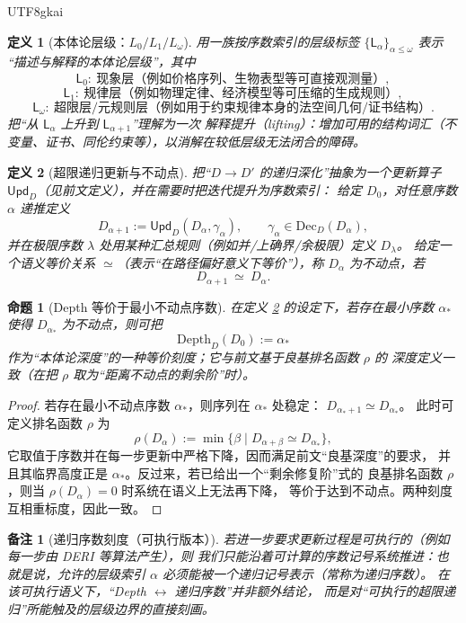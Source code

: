 \documentclass[12pt]{article}
\newtheorem{definition}{定义}[section]
\newtheorem{proposition}{命题}[section]
\newtheorem{remark}{备注}[section]
\begin{document}
\begin{CJK*}{UTF8}{gkai}
\begin{definition}[本体论层级：$L_0/L_1/L_\omega$]\label{def:onto-level}
用一族按序数索引的层级标签 $\{\mathsf{L}_\alpha\}_{\alpha\le\omega}$ 表示
“描述与解释的本体论层级”，其中
\[
  \mathsf{L}_0:\ \text{现象层（例如价格序列、生物表型等可直接观测量）},
\]
\[
  \mathsf{L}_1:\ \text{规律层（例如物理定律、经济模型等可压缩的生成规则）},
\]
\[
  \mathsf{L}_\omega:\ \text{超限层/元规则层（例如用于约束规律本身的法空间几何/证书结构）}.
\]
把“从 $\mathsf{L}_\alpha$ 上升到 $\mathsf{L}_{\alpha+1}$”理解为一次
\emph{解释提升（lifting）}：增加可用的结构词汇（不变量、证书、同伦约束等），以消解在较低层级无法闭合的障碍。
\end{definition}

\begin{definition}[超限递归更新与不动点]\label{def:transfinite-fixed-point}
把“$D\to D'$ 的递归深化”抽象为一个更新算子
$\mathsf{Upd}_D$（见前文定义），并在需要时把迭代提升为序数索引：
给定 $D_0$，对任意序数 $\alpha$ 递推定义
\[
  D_{\alpha+1}:=\mathsf{Upd}_D(D_\alpha,\gamma_\alpha),
\qquad
  \gamma_\alpha\in \mathrm{Dec}_D(D_\alpha),
\]
并在极限序数 $\lambda$ 处用某种汇总规则（例如并/上确界/余极限）定义 $D_\lambda$。
给定一个语义等价关系 $\simeq$（表示“在路径偏好意义下等价”），称 $D_\alpha$ 为\emph{不动点}，若
\[
  D_{\alpha+1}\ \simeq\ D_\alpha.
\]
\end{definition}

\begin{proposition}[Depth 等价于最小不动点序数]\label{prop:depth-fixed-point}
在定义 \ref{def:transfinite-fixed-point} 的设定下，若存在最小序数 $\alpha_\ast$
使得 $D_{\alpha_\ast}$ 为不动点，则可把
\[
  \mathrm{Depth}_D(D_0):=\alpha_\ast
\]
作为“本体论深度”的一种等价刻度；它与前文基于良基排名函数 $\rho$ 的
深度定义一致（在把 $\rho$ 取为“距离不动点的剩余阶”时）。
\end{proposition}

\begin{proof}
若存在最小不动点序数 $\alpha_\ast$，则序列在 $\alpha_\ast$ 处稳定：
$D_{\alpha_\ast+1}\simeq D_{\alpha_\ast}$。
此时可定义排名函数 $\rho$ 为
\[
  \rho(D_\alpha):=\min\{\beta\mid D_{\alpha+\beta}\simeq D_{\alpha_\ast}\},
\]
它取值于序数并在每一步更新中严格下降，因而满足前文“良基深度”的要求，
并且其临界高度正是 $\alpha_\ast$。反过来，若已给出一个“剩余修复阶”式的
良基排名函数 $\rho$，则当 $\rho(D_\alpha)=0$ 时系统在语义上无法再下降，
等价于达到不动点。两种刻度互相重标度，因此一致。
\end{proof}

\begin{remark}[递归序数刻度（可执行版本）]
若进一步要求更新过程是\emph{可执行的}（例如每一步由 DERI 等算法产生），则
我们只能沿着可计算的序数记号系统推进：也就是说，允许的层级索引
$\alpha$ 必须能被一个递归记号表示（常称为\emph{递归序数}）。
在该可执行语义下，“Depth $\leftrightarrow$ 递归序数”并非额外结论，
而是对“可执行的超限递归”所能触及的层级边界的直接刻画。
\end{remark}


\end{CJK*}
\end{document}
